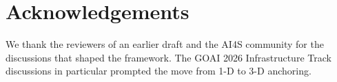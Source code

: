 \documentclass[review,3p]{elsarticle}
\begin{document}
\section*{Acknowledgements}
We thank the reviewers of an earlier draft and the AI4S community for the discussions that shaped the framework. The GOAI 2026 Infrastructure Track discussions in particular prompted the move from 1-D to 3-D anchoring.



\end{document}
